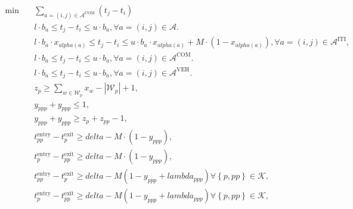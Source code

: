 \begin{align}
  \min\quad & \underset{a = \left(i , j\right) \in \mathcal{A}^{\text{COM}}}{\sum} \left(t_{j} - t_{i}\right) \tag{eq\_0016} \\
  & l \cdot b_{a} \leq t_{j} - t_{i} \leq u \cdot b_{a} , \forall a = \left(i , j\right) \in \mathcal{A} . \tag{eq\_0002} \\
  & l \cdot b_{a} \cdot x_{\mathit{alpha} \left(a\right)} \leq t_{j} - t_{i} \leq u \cdot b_{a} \cdot x_{\mathit{alpha} \left(a\right)} + M \cdot \left(1 - x_{\mathit{alpha} \left(a\right)}\right) , \forall a = \left(i , j\right) \in \mathcal{A}^{\text{ITI}} , \tag{eq\_0003} \\
  & l \cdot b_{a} \leq t_{j} - t_{i} \leq u \cdot b_{a} , \forall a = \left(i , j\right) \in \mathcal{A}^{\text{COM}} . \tag{eq\_0004} \\
  & l \cdot b_{a} \leq t_{j} - t_{i} \leq u \cdot b_{a} , \forall a = \left(i , j\right) \in \mathcal{A}^{\text{VEH}} . \tag{eq\_0005} \\
  & z_{p} \geq \sum_{w \in \mathcal{W}_{p}} x_{w} - \left|\mathcal{W}_{p}\right| + 1 , \tag{eq\_0006} \\
  & y_{p pp} + y_{pp p} \leq 1 , \tag{eq\_0007} \\
  & y_{p pp} + y_{pp p} \geq z_{p} + z_{pp} - 1 , \tag{eq\_0008} \\
  & t_{pp}^{\text{entry}} - t_{p}^{\text{exit}} \geq \mathit{delta} - M \cdot \left(1 - y_{p pp}\right) , \tag{eq\_0009} \\
  & t_{p}^{\text{entry}} - t_{pp}^{\text{exit}} \geq \mathit{delta} - M \cdot \left(1 - y_{pp p}\right) , \tag{eq\_0011} \\
  & t_{pp}^{\text{entry}} - t_{p}^{\text{exit}} \geq \mathit{delta} - M \left(1 - y_{p pp} + \mathit{lambda}_{p pp}\right) \forall \left\{p , pp\right\} \in \mathcal{K} , \tag{eq\_0040} \\
  & t_{p}^{\text{entry}} - t_{pp}^{\text{exit}} \geq \mathit{delta} - M \left(1 - y_{pp p} + \mathit{lambda}_{p pp}\right) \forall \left\{p , pp\right\} \in \mathcal{K} , \tag{eq\_0041} \\
\end{align}
